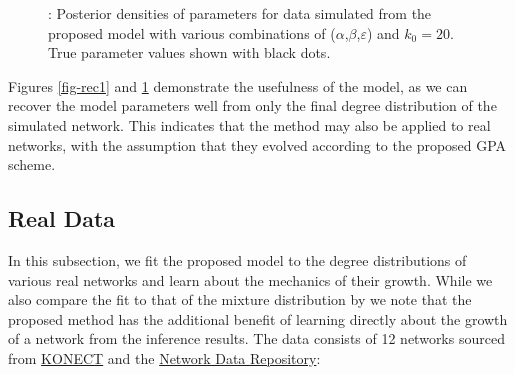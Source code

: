 \documentclass[
  sn-basic,
  10pt,
]{sn-jnl}
\theoremstyle{thmstyleone}
\theoremstyle{thmstyleone}
\theoremstyle{remark}
\theoremstyle{plain}
\theoremstyle{plain}
\theoremstyle{remark}
\begin{document}
\begin{figure}


\caption{\label{fig-rec2}: Posterior densities of parameters for data
simulated from the proposed model with various combinations of
(\(\alpha\),\(\beta\),\(\varepsilon\)) and \(k_0=20\). True parameter
values shown with black dots.}

\end{figure}%

Figures \ref{fig-rec1} and \ref{fig-rec2} demonstrate the usefulness of
the model, as we can recover the model parameters well from only the
final degree distribution of the simulated network. This indicates that
the method may also be applied to real networks, with the assumption
that they evolved according to the proposed GPA scheme.

\subsection{Real Data}\label{sec-real}

In this subsection, we fit the proposed model to the degree
distributions of various real networks and learn about the mechanics of
their growth. While we also compare the fit to that of the mixture
distribution by \citet{Lee24} we note that the proposed method has the
additional benefit of learning directly about the growth of a network
from the inference results. The data consists of 12 networks sourced
from \href{konect.cc}{KONECT} and the
\href{https://networkrepository.com}{Network Data Repository}\citep{nr}:
\end{document}
